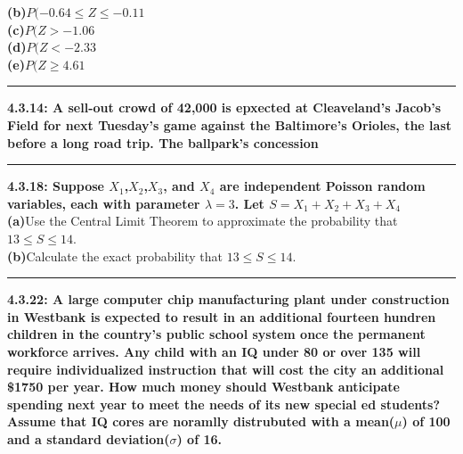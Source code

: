 \documentclass[11pt]{article}
\newcommand\question[2]{\vspace{.25in}\hrule\textbf{#1: #2}\vspace{.5em}\vspace{.10in}}
\renewcommand\part[1]{\vspace{.10in}\textbf{(#1)}}
\begin{document}
\part{b}{$P(-0.64 \leq Z \leq -0.11$}
\\
\part{c}{$P(Z > -1.06$}
\\
\part{d}{$P(Z < -2.33$}
\\
\part{e}{$P(Z \geq 4.61$}
\\


\question{4.3.14}
{A sell-out crowd of 42,000 is epxected at Cleaveland's Jacob's Field for next
Tuesday's game against the Baltimore's Orioles, the last before a long road trip.
The ballpark's concession}
\\


\question{4.3.18}
{Suppose $X_{1}$,$X_{2}$,$X_{3}$, and $X_{4}$ are independent Poisson random
variables, each with parameter $\lambda = 3$. Let $S=X_{1}+X_{2}+X_{3}+X_{4}$}
\\
\part{a}{Use the Central Limit Theorem to approximate the probability that
$13 \leq S \leq 14$.}
\\
\part{b}{Calculate the exact probability that $13 \leq S \leq 14$.}
\\


\question{4.3.22}
{A large computer chip manufacturing plant under construction in Westbank is expected
to result in an additional fourteen hundren children in the country's public school
system once the permanent workforce arrives. Any child with an IQ under 80 or over
135 will require individualized instruction that will cost the city an additional 
\$1750 per year. How much money should Westbank anticipate spending next year to meet
the needs of its new special ed students? Assume that IQ cores are noramlly distrubuted
with a mean($\mu$) of 100 and a standard deviation($\sigma$) of 16.}
\\
\end{document}
